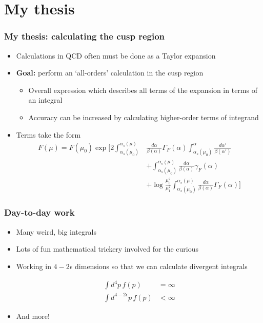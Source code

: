 \documentclass{beamer}
\begin{document}
\section{My thesis}
	\begin{frame}
		\frametitle{My thesis: calculating the cusp region}

		\begin{itemize}
			\item Calculations in QCD often must be done as a Taylor expansion

			\item \textbf{Goal:} perform an `all-orders' calculation in the cusp region
			\begin{itemize}
				\item Overall expression which describes all terms of the expansion in terms of an integral

				\item Accuracy can be increased by calculating higher-order terms of integrand
			\end{itemize}

			\item Terms take the form \cite{frye_factorization_2016}
			\begin{equation*}
			\begin{aligned}
				F(\mu) = F(\mu_0) \exp\Bigg[2\int_{\alpha_s(\mu_0)}^{\alpha_s(\mu)} &\frac{d\alpha}{\beta(\alpha)}\Gamma_F(\alpha)\int_{\alpha_s(\mu_0)}^\alpha \frac{d\alpha'}{\beta(\alpha')} \\
				&+ \int_{\alpha_s(\mu_0)}^{\alpha_s(\mu)} \frac{d\alpha}{\beta(\alpha)}\gamma_F(\alpha) \\
				&+ \log \frac{\mu_0^2}{\mu_1^2}\int_{\alpha_s(\mu_0)}^{\alpha_s(\mu)} \frac{d\alpha}{\beta(\alpha)}\Gamma_F(\alpha) \Bigg]
			\end{aligned}
			\end{equation*}
		\end{itemize}
	\end{frame}

	\begin{frame}
		\frametitle{Day-to-day work}
		\begin{itemize}
			\item Many weird, big integrals

			\item Lots of fun mathematical trickery involved for the curious

			\item Working in $4 - 2\epsilon$ dimensions so that we can calculate divergent integrals

			\begin{equation*}
			\begin{aligned}
				\int d^4p \,f(p) &= \infty \\
				\int d^{4-2\epsilon}p\, f(p) &< \infty
			\end{aligned}
			\end{equation*}

			\item And more!
		\end{itemize}
	\end{frame}
\end{document}
